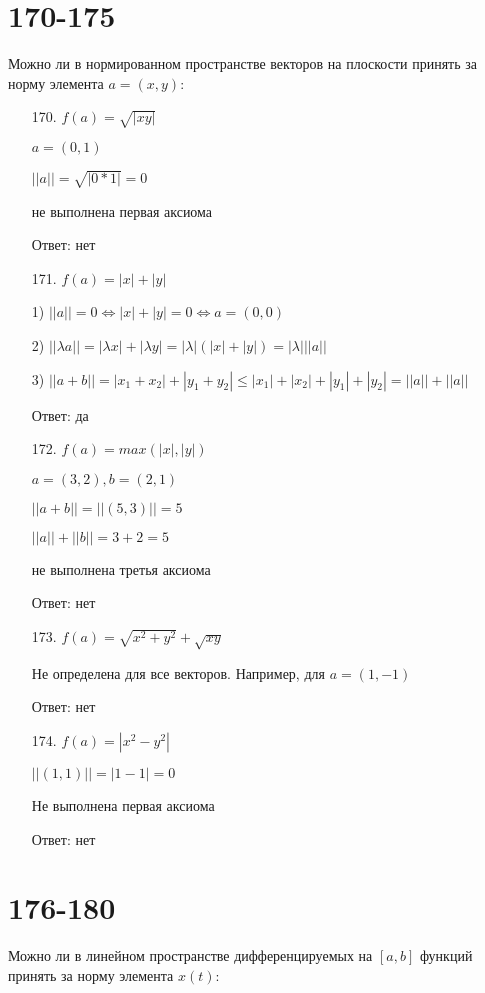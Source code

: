 \documentclass[oneside, final, 11pt]{article}
\begin{document}
\section{170-175}
	Можно ли в нормированном пространстве векторов на плоскости принять за норму элемента $a = (x, y)$:

	\begin{enumerate}
		\item[170.] $f(a) = \sqrt{|xy|}$
		
		$a = (0, 1) $
		
		$||a|| = \sqrt{|0*1|} = 0$
		
		не выполнена первая аксиома
				
		Ответ: нет
		
		\item[171.] $f(a) = |x| + |y|$
		
		1) $||a|| = 0 \Leftrightarrow |x| + |y| = 0 \Leftrightarrow a = (0, 0)$
		
		2) $||\lambda a|| = |\lambda x| + |\lambda y| = |\lambda|(|x| + |y|) = |\lambda| ||a||$
		
		3) $||a + b|| = |x_1 + x_2| + |y_1 + y_2| \leq |x_1|+ |x_2| + |y_1| +|y_2| = ||a|| + ||a||$
		
		Ответ: да
		
		\item[172.] $f(a) = max(|x|, |y|)$
		
		$a = (3, 2), b = (2, 1)$
		
		$||a + b|| = ||(5, 3)|| = 5$
		
		$||a|| + ||b|| = 3 + 2 = 5$
		
		не выполнена третья аксиома
		
		Ответ: нет
		
		\item[173.] $f(a) = \sqrt{x^2 + y^2} + \sqrt{xy}$
		
		Не определена для все векторов. Например, для $a = (1, -1)$
		
		Ответ: нет
		
		\item[174.] $f(a) = |x^2 - y^2|$
		
		$||(1, 1)|| = |1 - 1| = 0$
		
		Не выполнена первая аксиома
		
		Ответ: нет
		
	\end{enumerate}


\section{176-180}
	Можно ли в линейном пространстве дифференцируемых на $[a, b]$ функций принять за норму элемента $x(t)$:
\end{document}
